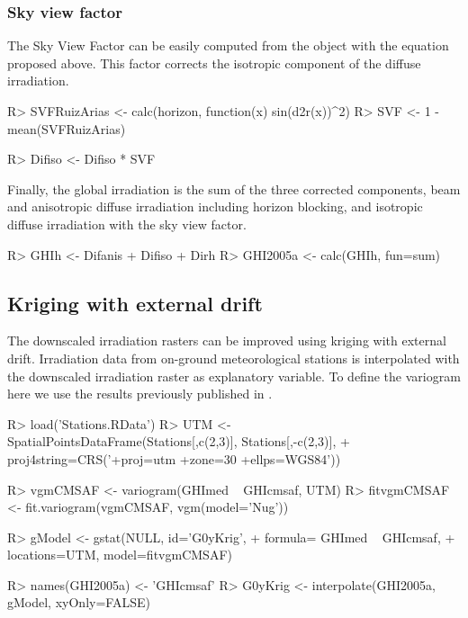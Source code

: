 \documentclass[article]{jss}
\begin{document}
\subsubsection{Sky view factor}
\label{sec-1-5-3}

The Sky View Factor can be easily computed from the 
object with the equation proposed above. This factor corrects the
isotropic component of the diffuse irradiation.

\begin{CodeChunk}
\begin{CodeInput}
R> SVFRuizArias <- calc(horizon, function(x) sin(d2r(x))^2)
R> SVF <- 1 - mean(SVFRuizArias)

R> Difiso <- Difiso * SVF
\end{CodeInput}
\end{CodeChunk}

Finally, the global irradiation is the sum of the three corrected
components, beam and anisotropic diffuse irradiation including horizon
blocking, and isotropic diffuse irradiation with the sky view factor.

\begin{CodeChunk}
\begin{CodeInput}
R> GHIh <- Difanis + Difiso + Dirh
R> GHI2005a <- calc(GHIh, fun=sum)
\end{CodeInput}
\end{CodeChunk}

\subsection{Kriging with external drift}
\label{sec-1-6}

The downscaled irradiation rasters can be improved using kriging
with external drift. Irradiation data from on-ground
meteorological stations is interpolated with the downscaled
irradiation raster as explanatory variable. To define the
variogram here we use the results previously published in
\citep{Antonanzas-Torres.Canizares.ea2013}.


\begin{CodeChunk}
\begin{CodeInput}
R> load('Stations.RData')
R> UTM <- SpatialPointsDataFrame(Stations[,c(2,3)], Stations[,-c(2,3)],
+                               proj4string=CRS('+proj=utm +zone=30 +ellps=WGS84'))


R> vgmCMSAF <- variogram(GHImed ~ GHIcmsaf, UTM)
R> fitvgmCMSAF <- fit.variogram(vgmCMSAF, vgm(model='Nug'))

R> gModel <- gstat(NULL, id='G0yKrig',
+                 formula= GHImed ~ GHIcmsaf,
+                 locations=UTM, model=fitvgmCMSAF)

R> names(GHI2005a) <- 'GHIcmsaf'
R> G0yKrig <- interpolate(GHI2005a, gModel, xyOnly=FALSE)
\end{CodeInput}
\end{CodeChunk}
\end{document}
